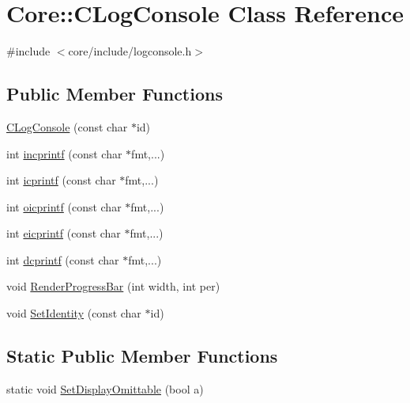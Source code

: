 \hypertarget{classCore_1_1CLogConsole}{}\section{Core\+:\+:C\+Log\+Console Class Reference}
\label{classCore_1_1CLogConsole}


{\ttfamily \#include $<$core/include/logconsole.\+h$>$}

\subsection*{Public Member Functions}
\begin{DoxyCompactItemize}
\item 
\hyperlink{classCore_1_1CLogConsole_a906e42d725e7723160e1fcbe6e948b7b}{C\+Log\+Console} (const char $\ast$id)
\item 
int \hyperlink{classCore_1_1CLogConsole_a42d89c1fb7a1c59a3237c3971d6a7b9e}{incprintf} (const char $\ast$fmt,...)
\item 
int \hyperlink{classCore_1_1CLogConsole_aff3446838ad49efab5313bb95aede7e0}{icprintf} (const char $\ast$fmt,...)
\item 
int \hyperlink{classCore_1_1CLogConsole_a0630094f233c661cc3b6e06e6e29f309}{oicprintf} (const char $\ast$fmt,...)
\item 
int \hyperlink{classCore_1_1CLogConsole_a53ec3f083cdbb954c5fe2ef1cf3e5547}{eicprintf} (const char $\ast$fmt,...)
\item 
int \hyperlink{classCore_1_1CLogConsole_a2b78016730edc3d5c5449f85f3d159a9}{dcprintf} (const char $\ast$fmt,...)
\item 
void \hyperlink{classCore_1_1CLogConsole_a03ec328b3b92649928a59057927a39d2}{Render\+Progress\+Bar} (int width, int per)
\item 
void \hyperlink{classCore_1_1CLogConsole_ae770319ddb28995ceda33d3505c2753e}{Set\+Identity} (const char $\ast$id)
\end{DoxyCompactItemize}
\subsection*{Static Public Member Functions}
\begin{DoxyCompactItemize}
\item 
static void \hyperlink{classCore_1_1CLogConsole_a8d3d6b793d9c19391fc2052313f9dc5c}{Set\+Display\+Omittable} (bool a)
\end{DoxyCompactItemize}


